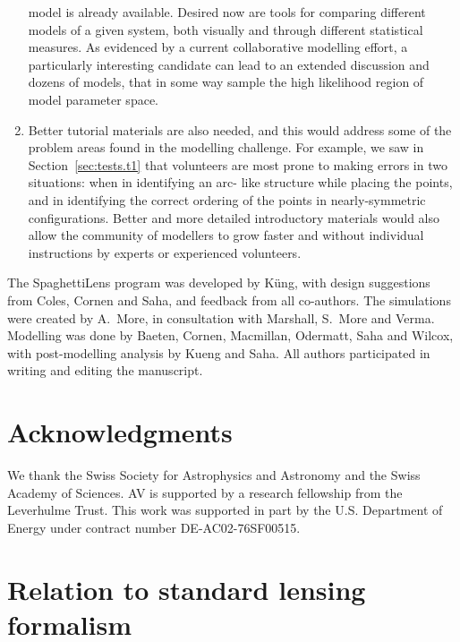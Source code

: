 \documentclass[usenatbib]{mn2e}
\newcommand{\spl}{SpaghettiLens\xspace}
\newcommand{\secref}[1]{Section~\ref{sec:#1}}
\begin{document}
\begin{enumerate}
  model is already available.  Desired now are tools for comparing
  different models of a given system, both visually and through
  different statistical measures.  As evidenced by a current
  collaborative modelling effort, a particularly interesting candidate
  can lead to an extended discussion and dozens of models, that
  in some way sample the high likelihood region of model parameter
  space.
\item Better tutorial materials are also needed, and this would
  address some of the problem areas found in the modelling challenge.
  For example, we saw in \secref{tests.t1} that volunteers are most
  prone to making errors in two situations: when in identifying an arc-
  like structure while placing the points, and in identifying the
  correct ordering of the points in nearly-symmetric configurations.
  Better and more detailed introductory materials would also allow
  the community of modellers to grow faster and without individual
  instructions by experts or experienced volunteers.
\end{enumerate}

The \spl program was developed by Küng, with design suggestions from
Coles, Cornen and Saha, and feedback from all co-authors.  The
simulations were created by A.~More, in consultation with Marshall,
S.~More and Verma.  Modelling was done by Baeten, Cornen, Macmillan,
Odermatt, Saha and Wilcox, with post-modelling analysis by Kueng and
Saha.  All authors participated in writing and editing the manuscript.



\section*{Acknowledgments}

We thank the Swiss Society for Astrophysics and Astronomy and the
Swiss Academy of Sciences. AV is supported by a research fellowship
from the Leverhulme Trust. This work was supported in part by the U.S.
Department of Energy under contract number DE-AC02-76SF00515.


\appendix

\section{Relation to standard lensing formalism}\label{more-theory}
\end{document}
